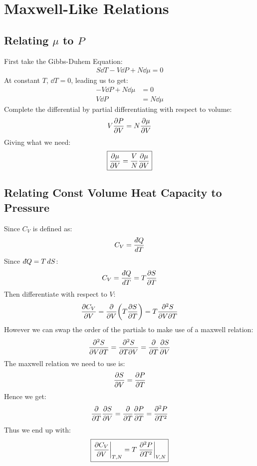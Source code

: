 \documentclass[12pt]{article}
\newcommand{\dbar}{d\hspace*{-0.08em}\bar{}\hspace*{0.1em}}
\begin{document}
\section{Maxwell-Like Relations}
\subsection{Relating $\mu$ to $P$}
First take the Gibbs-Duhem Equation:
\begin{align*}
  S\dd{T}-V\dd{P}+N\dd{\mu}=0
\end{align*}
At constant $T$, $\dd{T}=0$, leading us to get:
\begin{align*}
  -V\dd{P}+N\dd{\mu}&=0\\
  V\dd{P}&=N\dd{\mu}
\end{align*}
Complete the differential by partial differentiating with respect to volume:
\begin{align*}
  V\pdv{P}{V}=N\pdv{\mu}{V}
\end{align*}
Giving what we need:
\begin{align}
  \boxed{\pdv{\mu}{V}=\frac{V}{N}\pdv{\mu}{V}}
\end{align}
\subsection{Relating Const Volume Heat Capacity to Pressure}
Since $C_V$ is defined as:
\begin{align*}
  C_V=\frac{\dbar Q}{dT}
\end{align*}
Since $\dbar{Q}=T\dd{S}$:
\begin{align*}
  C_V=\frac{\dbar Q}{dT}=T\pdv{S}{T}
\end{align*}
Then differentiate with respect to $V$:
\begin{align*}
  \pdv{C_V}{V}=\pdv{V}\qty(T\pdv{S}{T})=T\pdv{S}{V}{T}
\end{align*}
However we can swap the order of the partials to make use of a maxwell relation:
\begin{align*}
  \pdv{S}{V}{T}=\pdv{S}{T}{V}=\pdv{T}\pdv{S}{V}
\end{align*}
The maxwell relation we need to use is:
\begin{align*}
  \pdv{S}{V}=\pdv{P}{T}
\end{align*}
Hence we get:
\begin{align*}
  \pdv{T}\pdv{S}{V}=\pdv{T}\pdv{P}{T}=\pdv[2]{P}{T}
\end{align*}
Thus we end up with:
\begin{align}
  \boxed{
    \eval{\pdv{C_V}{V}}_{T,N}=T\eval{\pdv[2]{P}{T}}_{V,N}
  }
\end{align}
\end{document}
